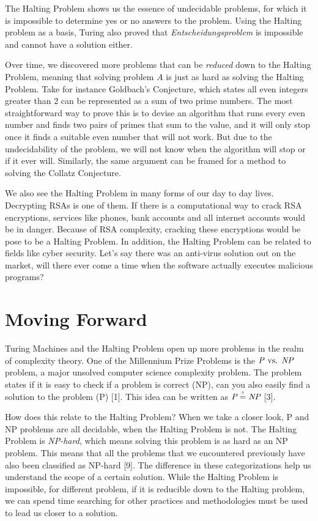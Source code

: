 \documentclass[12pt]{article}
\begin{document}
The Halting Problem shows us the essence of undecidable problems, for which it is impossible to determine yes or no answers to the problem. Using the Halting problem as a basis, Turing also proved that \textit{Entscheidungsproblem} is impossible and cannot have a solution either.

Over time, we discovered more problems that can be \textit{reduced} down to the Halting Problem, meaning that solving problem $A$ is just as hard as solving the Halting Problem. Take for instance Goldbach's Conjecture, which states all even integers greater than 2 can be represented as a sum of two prime numbers. The most straightforward way to prove this is to devise an algorithm that runs every even number and finds two pairs of primes that sum to the value, and it will only stop once it finds a suitable even number that will not work. But due to the undecidability of the problem, we will not know when the algorithm will stop or if it ever will. Similarly, the same argument can be framed for a method to solving the Collatz Conjecture. 

We also see the Halting Problem in many forms of our day to day lives. Decrypting RSAs is one of them. If there is a computational way to crack RSA encryptions, services like phones, bank accounts and all internet accounts would be in danger. Because of RSA complexity, cracking these encryptions would be pose to be a Halting Problem. In addition, the Halting Problem can be related to fields like cyber security. Let's say there was an anti-virus solution out on the market, will there ever come a time when the software actually executes malicious programs? 

\section{Moving Forward}

Turing Machines and the Halting Problem open up more problems in the realm of complexity theory. One of the Millennium Prize Problems is the $\text{\textit{P} vs. \textit{NP}}$ problem, a major unsolved computer science complexity problem. The problem states if it is easy to check if a problem is correct (NP), can you also easily find a solution to the problem (P) [1]. This idea can be written as $\textit{P}\stackrel{\text{\tiny ?}}{=}\textit{NP}$ [3].

How does this relate to the Halting Problem? When we take a closer look, P and NP problems are all decidable, when the Halting Problem is not. The Halting Problem is \textit{NP-hard}, which means solving this problem is as hard as an NP problem. This means that all the problems that we encountered previously have also been classified as NP-hard [9]. The difference in these categorizations help us understand the scope of a certain solution. While the Halting Problem is impossible, for different problem, if it is reducible down to the Halting problem, we can spend time searching for other practices and methodologies must be used to lead us closer to a solution.
\end{document}
